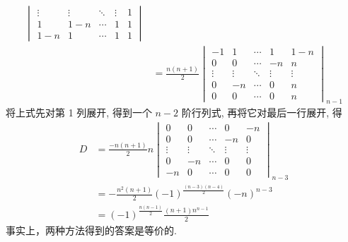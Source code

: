 \begin{enumerate}
\begin{enumerate}
\begin{enumerate}
\begin{align*}
\begin{vmatrix}
                                      \vdots & \vdots & \ddots & \vdots & 1   \\
                                      1      & 1-n    & \cdots & 1      & 1   \\
                                      1-n    & 1      & \cdots & 1      & 1
                                  \end{vmatrix}                         \\
                                    & =\frac{n(n+1)}{2}\begin{vmatrix}
                                                           -1     & 1      & \cdots & 1      & 1-n    \\
                                                           0      & 0      & \cdots & -n     & n      \\
                                                           \vdots & \vdots & \ddots & \vdots & \vdots \\
                                                           0      & -n     & \cdots & 0      & n      \\
                                                           0      & 0      & \cdots & 0      & n
                                                       \end{vmatrix}_{n-1}
                              \end{align*}
                              将上式先对第 1 列展开, 得到一个 $n-2$ 阶行列式, 再将它对最后一行展开, 得
                              \begin{align*}
                                  D & =\frac{-n(n+1)}{2} n
                                  \begin{vmatrix}
                                      0      & 0      & \cdots & 0      & -n     \\
                                      0      & 0      & \cdots & -n     & 0      \\
                                      \vdots & \vdots & \ddots & \vdots & \vdots \\
                                      0      & -n     & \cdots & 0      & 0      \\
                                      -n     & 0      & \cdots & 0      & 0
                                  \end{vmatrix}_{n-3} \\
                                    & =-\frac{n^{2}(n+1)}{2}(-1)^{\frac{(n-3)(n-4)}{2}}(-n)^{n-3} \\
                                    & =(-1)^{\frac{n(n-1)}{2} }\frac{(n+1) n^{n-1}}{2}
                              \end{align*}
                              事实上，两种方法得到的答案是等价的.
                    \end{enumerate}
          \end{enumerate}


\end{enumerate}

